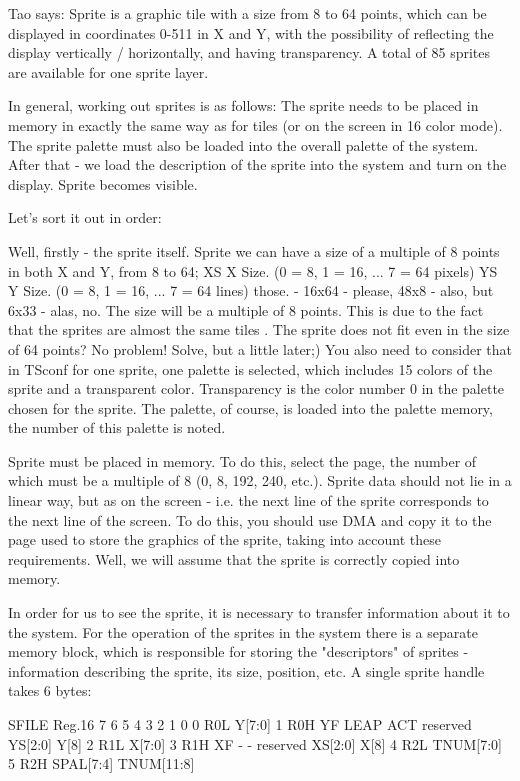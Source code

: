 
Tao says: Sprite is a graphic tile with a size from 8 to 64 points, which can be displayed in coordinates 0-511 in X and Y, with the possibility of reflecting the display vertically / horizontally, and having transparency. 
A total of 85 sprites are available for one sprite layer.


In general, working out sprites is as follows:
The sprite needs to be placed in memory in exactly the same way as for tiles (or on the screen in 16 color mode).
The sprite palette must also be loaded into the overall palette of the system.
After that - we load the description of the sprite into the system and turn on the display.
Sprite becomes visible.

Let's sort it out in order: 

Well, firstly - the sprite itself. 
Sprite we can have a size of a multiple of 8 points in both X and Y, from 8 to 64;
XS X Size. (0 = 8, 1 = 16, ... 7 = 64 pixels) 
YS Y Size. (0 = 8, 1 = 16, ... 7 = 64 lines)
those. - 16x64 - please, 48x8 - also, but 6x33 - alas, no. The size will be a multiple of 8 points. 
This is due to the fact that the sprites are almost the same tiles . 
The sprite does not fit even in the size of 64 points? No problem! Solve, but a little later;) 
You also need to consider that in TSconf for one sprite, one palette is selected, which includes 15 colors of the sprite and a transparent color. Transparency is the color number 0 in the palette chosen for the sprite. The palette, of course, is loaded into the palette memory, the number of this palette is noted. 

Sprite must be placed in memory. To do this, select the page, the number of which must be a multiple of 8 (0, 8, 192, 240, etc.).
Sprite data should not lie in a linear way, but as on the screen - i.e. the next line of the sprite corresponds to the next line of the screen. 
To do this, you should use DMA and copy it to the page used to store the graphics of the sprite, taking into account these requirements. 
Well, we will assume that the sprite is correctly copied into memory. 

In order for us to see the sprite, it is necessary to transfer information about it to the system. For the operation of the sprites in the system there is a separate memory block, which is responsible for storing the "descriptors" of sprites - information describing the sprite, its size, position, etc. 
A single sprite handle takes 6 bytes:

SFILE	Reg.16	7	6	5	4	        3    2    1        	0
0	R0L	Y[7:0]							
1	R0H	YF	LEAP	ACT	reserved	YS[2:0]			Y[8]
2	R1L	X[7:0]							
3	R1H	XF	-	-	reserved	XS[2:0]			X[8]
4	R2L	TNUM[7:0]							
5	R2H	SPAL[7:4]				TNUM[11:8]			

